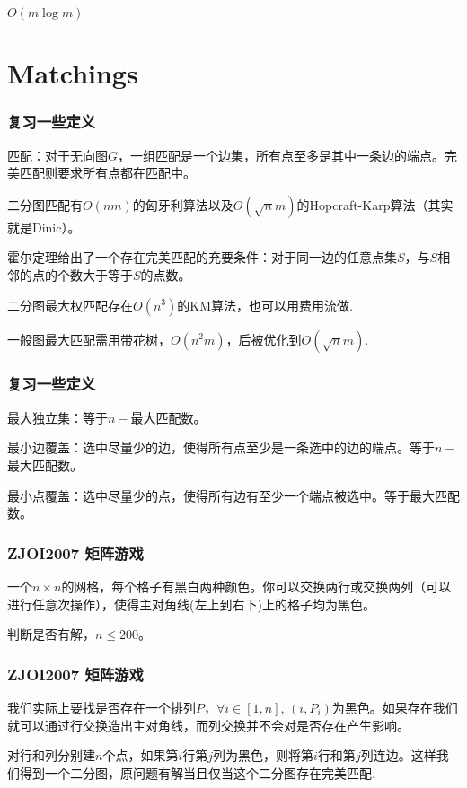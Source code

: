 \documentclass[10pt]{beamer}
\begin{document}
\begin{CJK}{UTF8}{gkai}
\begin{spacing}{1.1}
\begin{frame}
	$O(m \log m)$

\end{frame}

\section{Matchings}

\begin{frame}
\frametitle{复习一些定义}

	匹配：对于无向图$G$，一组匹配是一个边集，所有点至多是其中一条边的端点。完美匹配则要求所有点都在匹配中。\pause

	二分图匹配有$O(nm)$的匈牙利算法以及$O(\sqrt{n}m)$的Hopcraft-Karp算法（其实就是Dinic）。\pause

	霍尔定理给出了一个存在完美匹配的充要条件：对于同一边的任意点集$S$，与$S$相邻的点的个数大于等于$S$的点数。\pause

	二分图最大权匹配存在$O(n^3)$的KM算法，也可以用费用流做. \pause

	一般图最大匹配需用带花树，$O(n^2m)$，后被优化到$O(\sqrt{n}m)$.

\end{frame}

\begin{frame}
\frametitle{复习一些定义}

	最大独立集：等于$n - $最大匹配数。\pause

	最小边覆盖：选中尽量少的边，使得所有点至少是一条选中的边的端点。等于$n - $最大匹配数。\pause

	最小点覆盖：选中尽量少的点，使得所有边有至少一个端点被选中。等于最大匹配数。

\end{frame}

\begin{frame}
\frametitle{ZJOI2007 矩阵游戏}

	一个$n \times n$的网格，每个格子有黑白两种颜色。你可以交换两行或交换两列（可以进行任意次操作），使得主对角线(左上到右下)上的格子均为黑色。

	判断是否有解，$n \le 200$。

\end{frame}

\begin{frame}
\frametitle{ZJOI2007 矩阵游戏}

	我们实际上要找是否存在一个排列$P$，$\forall i \in [1, n]$, $(i, P_i)$为黑色。如果存在我们就可以通过行交换造出主对角线，而列交换并不会对是否存在产生影响。\pause

	对行和列分别建$n$个点，如果第$i$行第$j$列为黑色，则将第$i$行和第$j$列连边。这样我们得到一个二分图，原问题有解当且仅当这个二分图存在完美匹配.\pause


\end{frame}
\end{spacing}
\end{CJK}
\end{document}
